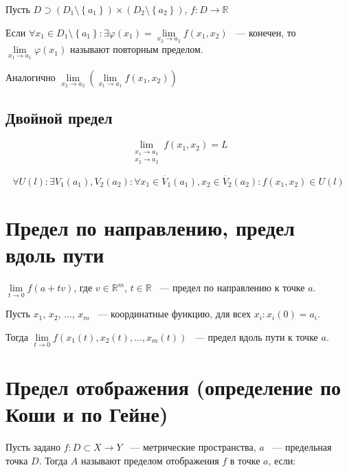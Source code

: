 \documentclass{article}
\begin{document}
            Пусть $D \supset \left(D_1 \setminus \left\{ a_1 \right\} \right) \times \left( D_2 \setminus \left\{ a_2 \right\} \right)$, $f : D \rightarrow \mathbb{R}$
        
            Если $\forall x_1 \in D_1 \setminus \left\{ a_1 \right\} : \exists \varphi(x_1) = \lim\limits_{x_2 \rightarrow a_2} f(x_1, x_2)$ ~--- конечен, то $\lim\limits_{x_1 \rightarrow a_1} \varphi(x_1)$ называют повторным пределом.
        
            Аналогично $\lim\limits_{x_2 \rightarrow a_2} \left(\lim\limits_{x_1 \rightarrow a_1} f(x_1, x_2) \right)$
            
        \subsection{Двойной предел}
        
            $$\lim_{\substack{x_1 \rightarrow a_1 \\ x_2 \rightarrow a_2 }} f(x_1, x_2) = L$$
            
            $$\forall U(l) : \exists V_1(a_1), V_2(a_2) : \forall x_1 \in \dot{V_1}(a_1), x_2 \in \dot{V_2}(a_2) : f(x_1, x_2) \in U(l)$$
            
    \newpage
    
    \section{Предел по направлению, предел вдоль пути}
           
        $\lim\limits_{t \rightarrow 0} f(a + tv)$, где $v \in \mathbb{R}^m$, $t \in \mathbb{R}$ ~--- предел по направлению к точке $a$.
        
        Пусть $x_1$, $x_2$, $\ldots$, $x_m$ ~--- координатные функцию, для всех $x_i : x_i(0) = a_i$. 
        
        Тогда $\lim\limits_{t \rightarrow 0} f(x_1(t), x_2(t), \ldots, x_m(t))$ ~--- предел вдоль пути к точке $a$.
    
    \newpage
    
    \section{Предел отображения (определение по Коши и по Гейне)}
    
        Пусть задано $f : D \subset X \rightarrow Y$ ~--- метрические пространства, $a$ ~--- предельная точка $D$. Тогда $A$ называют пределом отображения $f$ в точке $a$, если:
        
\end{document}
